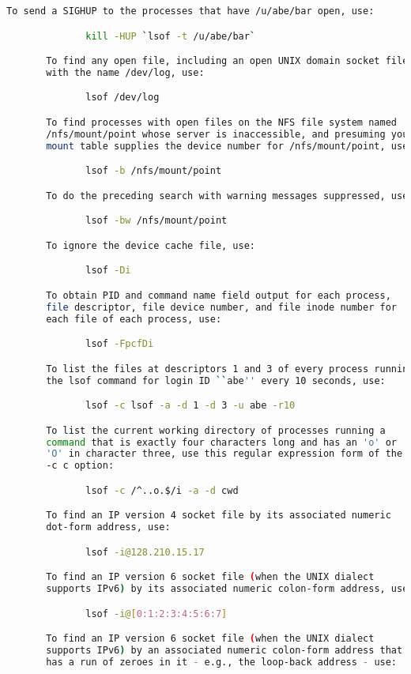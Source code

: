 {{\begin{lstlisting}[language=bash]
       To send a SIGHUP to the processes that have /u/abe/bar open, use:

              kill -HUP `lsof -t /u/abe/bar`

       To find any open file, including an open UNIX domain socket file,
       with the name /dev/log, use:

              lsof /dev/log

       To find processes with open files on the NFS file system named
       /nfs/mount/point whose server is inaccessible, and presuming your
       mount table supplies the device number for /nfs/mount/point, use:

              lsof -b /nfs/mount/point

       To do the preceding search with warning messages suppressed, use:

              lsof -bw /nfs/mount/point

       To ignore the device cache file, use:

              lsof -Di

       To obtain PID and command name field output for each process,
       file descriptor, file device number, and file inode number for
       each file of each process, use:

              lsof -FpcfDi

       To list the files at descriptors 1 and 3 of every process running
       the lsof command for login ID ``abe'' every 10 seconds, use:

              lsof -c lsof -a -d 1 -d 3 -u abe -r10

       To list the current working directory of processes running a
       command that is exactly four characters long and has an 'o' or
       'O' in character three, use this regular expression form of the
       -c c option:

              lsof -c /^..o.$/i -a -d cwd

       To find an IP version 4 socket file by its associated numeric
       dot-form address, use:

              lsof -i@128.210.15.17

       To find an IP version 6 socket file (when the UNIX dialect
       supports IPv6) by its associated numeric colon-form address, use:

              lsof -i@[0:1:2:3:4:5:6:7]

       To find an IP version 6 socket file (when the UNIX dialect
       supports IPv6) by an associated numeric colon-form address that
       has a run of zeroes in it - e.g., the loop-back address - use:


\end{lstlisting}}}
